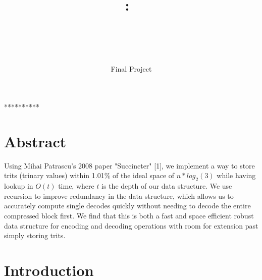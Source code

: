 \documentclass{article}
\title{\textmd{\textbf{\Class:\ \Title}}\\\normalsize\vspace{0.1in}\small{ \Date}\\\vspace{0.1in}\large{\textit{\ClassInstructor\ \ClassTime}}}
\author{\textbf{\AuthorName}}
\date{Final Project}
\begin{document}
\maketitle


\bigskip
\centerline{**********}

\noindent \section{Abstract}
Using Mihai Patrascu's 2008 paper "Succincter" [1],  we implement a way to store trits (trinary values) within 1.01\% of the ideal space of $n*log_2(3)$ while having lookup in $O(t)$ time, where $t$ is the depth of our data structure. We use recursion to improve redundancy in the data structure, which allows us to accurately compute single decodes quickly without needing to decode the entire compressed block first. We find that this is both a fast and space efficient robust data structure for encoding and decoding operations with room for extension past simply storing trits.

\noindent \section{Introduction}
\end{document}
